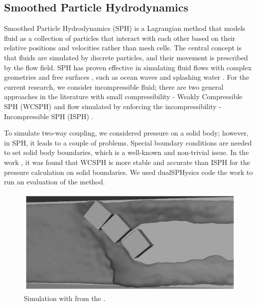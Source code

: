 \subsection{Smoothed Particle Hydrodynamics}

Smoothed Particle Hydrodynamics (SPH) is a Lagrangian method that models fluid as a collection of particles that interact with each other based on their relative positions and velocities rather than mesh cells. The central concept is that fluids are simulated by discrete particles, and their movement is prescribed by the flow field. SPH has proven effective in simulating fluid flows with complex geometries and free surfaces \cite{adami2012SPH}, such as ocean waves \cite{barreiro2013SPH} and splashing water \cite{moreira2020SPH}. For the current research, we consider incompressible fluid; there are two general approaches in the literature with small compressibility - Weakly Compressible SPH (WCSPH)\cite{ren2015nonlinear} and flow simulated by enforcing the incompressibility -  Incompressible SPH (ISPH) \cite{macia2012boundary}. 

To simulate two-way coupling, we considered pressure on a solid body; however, in SPH, it leads to a couple of problems. Special boundary conditions are needed to set solid body boundaries, which is a well-known and non-trivial issue. In the work \cite{kopysov2015modeling}, it was found that WCSPH is more stable and accurate than ISPH for the pressure calculation on solid boundaries. We used dualSPHysics code \cite{Dual_SPH2019accuracy} the work \cite{kopysov2015modeling} to run an evaluation of the method.

\begin{figure}[!ht]
    \centering
    \includegraphics[width=16cm]{GWU_Thesis_Sarmakeeva/Images/chap1/3_blocks_SPH.png}
    \caption{Simulation with \cite{Dual_SPH2019accuracy} from the \cite{sarmakeeva2017meshfree}.}
    \label{fig:3_blocks_SPH}
\end{figure}

